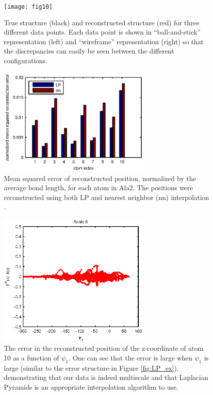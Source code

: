 \begin{figure}[t]
    \centering
    \texttt{[image: fig10]}
    \caption[Sample reconstructed alanine dipeptide configurations]{True structure (black) and reconstructed structure (red) for three different data points. Each data point is shown in ``ball-and-stick'' representation (left) and ``wireframe'' representation (right) so that the discrepancies can easily be seen between the different configurations.}
    \label{fig:ala_molecules}
\end{figure}

\begin{figure}[t]
    \includegraphics[width=3in]{fig11}
    \caption[Average error in reconstructed alanine dipeptide configurations]{Mean squared error of reconstructed position, normalized by the average bond length, for each atom in Ala2.
    The positions were reconstructed using both LP and nearest neighbor (nn) interpolation .}
    \label{fig:ala_mse}
\end{figure}

\begin{figure}[t]
    \centering
    \includegraphics[width=3in]{fig10b}
    \caption[Error in reconstructed alanine dipeptide configurations]{The error in the reconstructed position of the z-coordinate of atom 10 as a function of $\psi_1$. One can see that the error is large when $\psi_1$ is large (similar to the error structure in Figure \ref{fig:LP_ex}), demonstrating that our data is indeed multiscale and that Laplacian Pyramids is an appropriate interpolation algorithm to use.}
    \label{fig:LapPyr_ala2_errors}
\end{figure}

